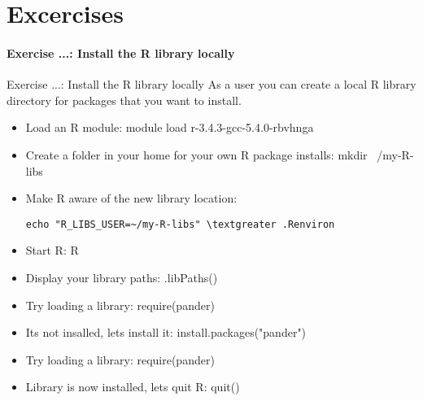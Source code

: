 \part{Excercises}
\begin{frame}
\partpage
\end{frame}

\subsection{Exercise ...: Install the R library locally}
\begin{frame}[fragile]{Exercise ...: Install the R library locally}
As a user you can create a local R library directory for packages that you want to install. 

\begin{itemize}
\item Load an R module: 
module load r-3.4.3-gcc-5.4.0-rbvhnga
\item Create a folder in your home for your own R package installs:
mkdir ~/my-R-libs
\item Make R aware of the new library location:
\begin{verbatim}
echo "R_LIBS_USER=~/my-R-libs" \textgreater .Renviron
\end{verbatim}
\item Start R:
R
\item Display your library paths:
.libPaths()
\item Try loading a library:
require(pander)
\item Its not insalled, lets install it:
install.packages("pander")
\item Try loading a library:
require(pander)
\item Library is now installed, lets quit R:
quit()
\end{itemize}
\end{frame}

